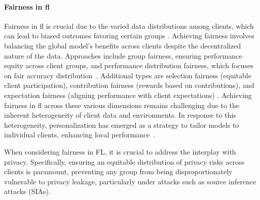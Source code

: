 \paragraph{\textbf{Fairness in \ac{fl}}}
Fairness in \ac{fl} is crucial due to the varied data distributions among clients, which can lead to biased outcomes favoring certain groups \cite{BG_Fairness_2}. Achieving fairness involves balancing the global model's benefits across clients despite the decentralized nature of the data. Approaches include group fairness, ensuring performance equity across client groups, and performance distribution fairness, which focuses on fair accuracy distribution~\cite{selialia2024mitigating}. Additional types are selection fairness (equitable client participation), contribution fairness (rewards based on contributions), and expectation fairness (aligning performance with client expectations) \cite{BG_Fairness}. Achieving fairness in \ac{fl} across these various dimensions remains challenging due to the inherent heterogeneity of client data and environments. In response to this heterogeneity, personalization has emerged as a strategy to tailor models to individual clients, enhancing local performance~\cite{BG_Personalization,BG_Personalization_2, BG_FairnessPrivacy}.   

When considering fairness in FL, it is crucial to address the interplay with privacy. Specifically, ensuring an equitable distribution of privacy risks across clients is paramount, preventing any group from being disproportionately vulnerable to privacy leakage, particularly under attacks such as source inference attacks (SIAs).


